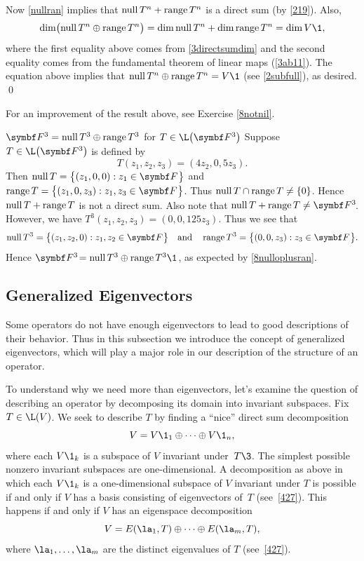 Now \ref{nullran} implies that $\operatorname{null} T^n + \operatorname{range} T^n$ is a direct sum (by \ref{219}). Also,
\[
\dim\paren[\big]{\ker T^n \oplus \ran T^n} = \dim \ker T^n + \dim \ran T^n = \dim V\1,
\]
where the first equality above comes from \ref{3directsumdim} and the second equality comes from the fundamental theorem of linear maps (\ref{3ab11}). The equation above implies that $\ker T^n \oplus \ran T^n = V\1$ (see \ref{2subfull}), as desired.
\qed

For an improvement of the result above, see Exercise \ref{8notnil}.

\begin{example}{$\F3 = \ker T^3 \oplus \ran T^3$ for\/ $T \in \L\paren[\big]{\F3}$}
Suppose $T \in \L\paren[\big]{\F{3}}$ is defined by
\[
T(z_1, z_2, z_3) = (4z_2, 0, 5z_3).
\]
Then $\ker T = \br[\big]{(z_1, 0, 0): z_1 \in \F{}}$ and
$\ran T = \br[\big]{(z_1, 0, z_3): z_1, z_3 \in \F{}}$. Thus $\operatorname{null} T \cap \operatorname{range} T \ne \{0\}$. Hence $\operatorname{null} T + \operatorname{range} T$ is not a direct sum. Also note that
$\ker T + \ran T \ne \FF3$. However, we have $T^3(z_1, z_2, z_3) = (0, 0, 125z_3)$. Thus we see that
\[
\ker T^3 = \br[\big]{(z_1, z_2, 0): z_1, z_2 \in \F{}} \andd
\ran T^3 = \br[\big]{(0, 0, z_3): z_3 \in \F{}}.
\]
Hence $\FF3 = \ker T^3 \oplus \ran T^3\1$, as expected by \ref{8nulloplusran}.
\end{example}

\subsection{Generalized Eigenvectors}

Some operators do not have enough eigenvectors to lead to good descriptions of their behavior. Thus in this subsection we introduce the concept of generalized eigenvectors, which will play a major role in our description of the structure of an operator.

To understand why we need more than eigenvectors, let's examine the
question of describing an operator by decomposing its domain into
invariant subspaces.  Fix $T \in \L(V)$.  We seek to describe $T$ by
finding a ``nice'' direct sum decomposition
\[
V = V\1_1 \oplus \dots \oplus V\1_n,
\]
where each $V\1_k$ is a subspace of $V$ invariant under~$T\3$. The simplest
possible nonzero invariant subspaces are one-dimensional.  A
decomposition as above in which each $V\1_k$ is a one-dimensional subspace
of $V$ invariant under $T$ is possible if and only if $V$ has a basis
consisting of eigenvectors of~$T$ (see~\ref{427}). This happens if
and only if $V$ has an eigenspace decomposition
\begin{equation} \label{429}
V = E(\la_1, T) \oplus \dots \oplus E(\la_m, T),
\end{equation}%
where $\la_1, \dots, \la_m$ are the distinct
eigenvalues of $T$ (see~\ref{427}).

